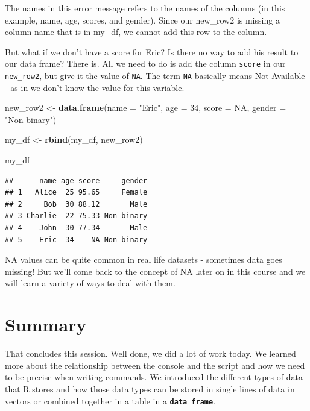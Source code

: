 \documentclass[
]{book}
\newenvironment{Shaded}{\begin{snugshade}}{\end{snugshade}}
\newcommand{\AttributeTok}[1]{\textcolor[rgb]{0.13,0.29,0.53}{#1}}
\newcommand{\ConstantTok}[1]{\textcolor[rgb]{0.56,0.35,0.01}{#1}}
\newcommand{\DecValTok}[1]{\textcolor[rgb]{0.00,0.00,0.81}{#1}}
\newcommand{\FunctionTok}[1]{\textcolor[rgb]{0.13,0.29,0.53}{\textbf{#1}}}
\newcommand{\NormalTok}[1]{#1}
\newcommand{\OtherTok}[1]{\textcolor[rgb]{0.56,0.35,0.01}{#1}}
\newcommand{\StringTok}[1]{\textcolor[rgb]{0.31,0.60,0.02}{#1}}
\begin{document}
The names in this error message refers to the names of the columns (in this example, name, age, scores, and gender). Since our new\_row2 is missing a column name that is in my\_df, we cannot add this row to the column.

But what if we don't have a score for Eric? Is there no way to add his result to our data frame? There is. All we need to do is add the column \texttt{score} in our \texttt{new\_row2}, but give it the value of \texttt{NA}. The term \texttt{NA} basically means Not Available - as in we don't know the value for this variable.

\begin{Shaded}
\begin{Highlighting}[]
\NormalTok{new\_row2 }\OtherTok{\textless{}{-}} \FunctionTok{data.frame}\NormalTok{(}\AttributeTok{name =} \StringTok{"Eric"}\NormalTok{, }\AttributeTok{age =} \DecValTok{34}\NormalTok{, }\AttributeTok{score =} \ConstantTok{NA}\NormalTok{, }\AttributeTok{gender =} \StringTok{"Non{-}binary"}\NormalTok{)}

\NormalTok{my\_df }\OtherTok{\textless{}{-}} \FunctionTok{rbind}\NormalTok{(my\_df, new\_row2)}

\NormalTok{my\_df}
\end{Highlighting}
\end{Shaded}

\begin{verbatim}
##      name age score     gender
## 1   Alice  25 95.65     Female
## 2     Bob  30 88.12       Male
## 3 Charlie  22 75.33 Non-binary
## 4    John  30 77.34       Male
## 5    Eric  34    NA Non-binary
\end{verbatim}

NA values can be quite common in real life datasets - sometimes data goes missing! But we'll come back to the concept of NA later on in this course and we will learn a variety of ways to deal with them.

\section{Summary}\label{summary-1}

That concludes this session. Well done, we did a lot of work today. We learned more about the relationship between the console and the script and how we need to be precise when writing commands. We introduced the different types of data that R stores and how those data types can be stored in single lines of data in vectors or combined together in a table in a \textbf{\texttt{data\ frame}}.
\end{document}
